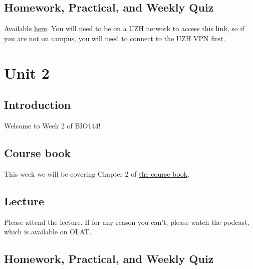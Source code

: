\documentclass[
  letterpaper,
  8pt,
  a4paper]{book}
\begin{document}
\section*{Homework, Practical, and Weekly
Quiz}\label{homework-practical-and-weekly-quiz}


Available
\href{https://rstudio.mnf.uzh.ch:3939/content/1913b078-b142-457f-8f08-8d66cc562490}{here}.
You will need to be on a UZH network to access this link, so if you are
not on campus, you will need to connect to the UZH VPN first.


\chapter*{Unit 2}\label{unit-2}


\section*{Introduction}\label{introduction-2}


Welcome to Week 2 of BIO144!

\section*{Course book}\label{course-book-1}


This week we will be covering Chapter 2 of
\href{https://opetchey.github.io/BIO144_Course_Book/}{the course book}.

\section*{Lecture}\label{lecture-1}


Please attend the lecture. If for any reason you can't, please watch the
podcast, which is available on OLAT.

\section*{Homework, Practical, and Weekly
Quiz}\label{homework-practical-and-weekly-quiz-1}
\end{document}
